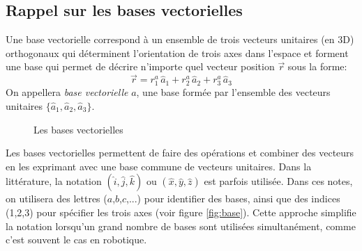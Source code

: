 \subsection{Rappel sur les bases vectorielles}
\label{vectorbasisrap}
Une base vectorielle correspond à un ensemble de trois vecteurs unitaires (en 3D) orthogonaux qui déterminent l'orientation de trois axes dans l'espace et forment une base qui permet de décrire n'importe quel vecteur position $\vec{r}$ sous la forme:
\begin{equation}
	\vec{r} = r_1^a \, \hat{a}_{1} + r_2^a \, \hat{a}_{2} + r_3^a \, \hat{a}_{3}
	\label{eq:vecbasisr}
\end{equation}
On appellera \textit{base vectorielle} $a$, une base formée par l'ensemble des vecteurs unitaires $\{\hat{a}_{1},\hat{a}_{2},\hat{a}_{3}\}$.
%
\begin{figure}[htpb]
	\centering
	\hspace{10pt}
	\hspace{10pt}
	\caption{Les bases vectorielles}
	\label{fig:vecbasis}
\end{figure}

Les bases vectorielles permettent de faire des opérations et combiner des vecteurs en les exprimant avec une base commune de vecteurs unitaires. Dans la littérature, la notation $(\hat{i},\hat{j},\hat{k})$ ou $(\hat{x},\hat{y},\hat{z})$ est parfois utilisée. Dans ces notes, on utilisera des lettres ($a$,$b$,$c$,...) pour identifier des bases, ainsi que des indices (1,2,3) pour spécifier les trois axes (voir figure \ref{fig:base}). Cette approche simplifie la notation lorsqu'un grand nombre de bases sont utilisées simultanément, comme c'est souvent le cas en robotique.





